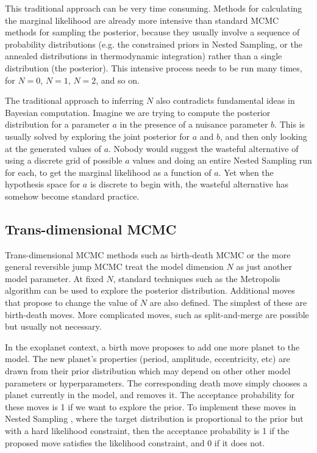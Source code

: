 \documentclass[useAMS,usenatbib]{mn2e}
\begin{document}
This traditional approach can be very time consuming.
Methods for calculating the marginal likelihood are
already more intensive than standard MCMC methods for sampling the posterior,
because they usually involve a sequence of probability distributions
(e.g. the constrained priors in Nested Sampling, or the annealed distributions
in thermodynamic integration) rather than a single distribution (the posterior).
This intensive process needs to be run many times, for $N=0$, $N=1$, $N=2$, and
so on.

The traditional approach to inferring $N$ also contradicts
fundamental ideas in Bayesian
computation. Imagine we are trying to compute the posterior distribution for
a parameter $a$ in the presence of a nuisance parameter $b$. This is usually solved
by exploring the joint posterior for $a$ and $b$, and then only looking at the
generated values of $a$. Nobody would suggest the wasteful alternative
of using a discrete grid of possible $a$ values and doing an entire Nested
Sampling run for each, to get the marginal likelihood as a function of $a$.
Yet when the hypothesis space for $a$ is discrete to begin with, the wasteful
alternative has somehow become standard practice.

\subsection{Trans-dimensional MCMC}
Trans-dimensional MCMC methods such as birth-death MCMC \citep{birthdeath} or the
more general reversible jump MCMC \citep{green} treat the model dimension
$N$ as just another model parameter. At fixed $N$, standard techniques such
as the Metropolis algorithm can be used to explore the posterior distribution.
Additional moves that propose to change the value of $N$ are also defined. The
simplest of these are birth-death moves. More complicated moves, such as
split-and-merge \citep[e.g.][]{umstatter} are possible but usually not necessary.

In the exoplanet context, a birth move
proposes to add one more planet to the model. The new planet's properties
(period, amplitude, eccentricity, etc) are drawn from their prior distribution
which may depend on other other model parameters or hyperparameters.
The corresponding death move simply chooses a planet currently in the model,
and removes it. The acceptance probability for these moves is 1 if we want
to explore the prior. To implement these moves in Nested Sampling
\citep{skilling}, where the target distribution is proportional to the prior but with a hard likelihood
constraint, then the acceptance probability is 1 if the proposed move
satisfies the likelihood constraint, and 0 if it does not.
\end{document}
